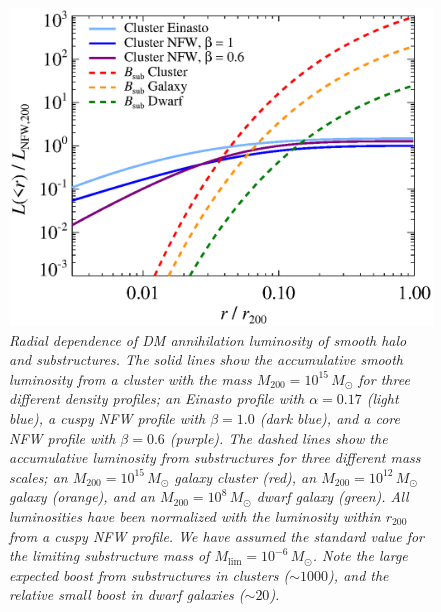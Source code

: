 \documentclass[10pt,aps,pra,reprint,amsmath,amsfonts,amssymb,showpacs,nofootinbib,floatfix]{revtex4-1}
\newcommand{\rmn}{\mathrm}
\newcommand{\msun}{M_\odot}
\newcommand{\rvir}{r_{200}}
\newcommand{\mvir}{M_{200}}
\begin{document}
\begin{figure}%
 \includegraphics[width=0.99\columnwidth]{figures/dens.prof.eps}
 \caption{\it Radial dependence of DM annihilation luminosity of
   smooth halo and substructures. The solid lines show the
   accumulative smooth luminosity from a cluster with the mass
   $\mvir=10^{15}\,\msun$ for three different density profiles; an
   Einasto profile with $\alpha=0.17$ (light blue), a cuspy NFW
   profile with $\beta=1.0$ (dark blue), and a core NFW profile with
   $\beta=0.6$ (purple). The dashed lines show the accumulative
   luminosity from substructures for three different mass scales; an
   $\mvir=10^{15}\,\msun$ galaxy cluster (red), an
   $\mvir=10^{12}\,\msun$ galaxy (orange), and an
   $\mvir=10^{8}\,\msun$ dwarf galaxy (green). All luminosities have
   been normalized with the luminosity within $\rvir$ from a cuspy NFW
   profile. We have assumed the standard value for the limiting
   substructure mass of $M_\rmn{lim}=10^{-6}\,\msun$. Note the large
   expected boost from substructures in clusters ($\sim1000$), and the
   relative small boost in dwarf galaxies ($\sim20$).}
 \label{fig:radial_lum}
\end{figure}
\end{document}
